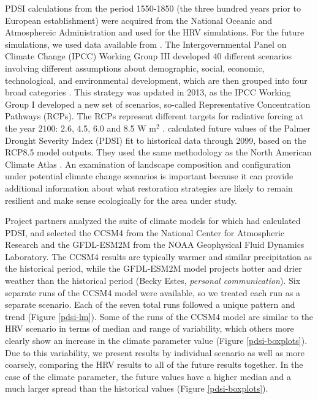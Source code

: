 \documentclass[12pt]{article}
\begin{document}
\begin{spacing}{1}
PDSI calculations from the period 1550-1850 (the three hundred years prior to European establishment) were acquired from the National Oceanic and Atmosphereic Administration and used for the HRV simulations. For the future simulations, we used data available from \citet{Cook2014}. The Intergovernmental Panel on Climate Change (IPCC) Working Group III developed 40 different scenarios involving different assumptions about demographic, social, economic, technological, and environmental development, which are then grouped into four broad categories \citep{Nakicenovic2000}. This strategy was updated in 2013, as the IPCC Working Group I developed a new set of scenarios, so-called Representative Concentration Pathways (RCPs). The RCPs represent different targets for radiative forcing at the year 2100: 2.6, 4.5, 6.0 and 8.5 W m$^2$ \citep{Stocker2013}. \citet{Cook2014} calculated future values of the Palmer Drought Severity Index (PDSI) fit to historical data through 2099, based on the RCP8.5 model outputs. They used the same methodology as the North American Climate Atlas \citep{Cook2004}. An examination of landscape composition and configuration under potential climate change scenarios is important because it can provide additional information about what restoration strategies are likely to remain resilient and make sense ecologically for the area under study. 

Project partners analyzed the suite of climate models for which \citet{Cook2014} had calculated PDSI, and selected the CCSM4 from the National Center for Atmospheric Research and the GFDL-ESM2M from the NOAA Geophysical Fluid Dynamics Laboratory. The CCSM4 results are typically warmer and similar precipitation as the historical period, while the GFDL-ESM2M model projects hotter and drier weather than the historical period (Becky Estes, \emph{personal communication}). Six separate runs of the CCSM4 model were available, so we treated each run as a separate scenario. Each of the seven total runs followed a unique pattern and trend (Figure \ref{pdsi-lm}). Some of the runs of the CCSM4 model are similar to the HRV scenario in terms of median and range of variability, which others more clearly show an increase in the climate parameter value (Figure \ref{pdsi-boxplots}). Due to this variability, we present results by individual scenario as well as more coarsely, comparing the HRV results to all of the future results together. In the case of the climate parameter, the future values have a higher median and a much larger spread than the historical values (Figure \ref{pdsi-boxplots}).




\end{spacing}
\end{document}
